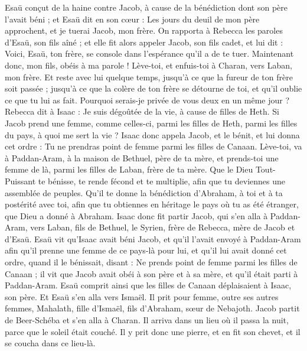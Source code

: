 \begin{multicols}{2}
Esaü conçut de la haine contre Jacob, à cause de la bénédiction dont son père l'avait béni ; et Esaü dit en son cœur : Les jours du deuil de mon père approchent, et je tuerai Jacob, mon frère.
On rapporta à Rebecca les paroles d'Esaü, son fils aîné ; et elle fit alors appeler Jacob, son fils cadet, et lui dit : Voici, Esaü, ton frère, se console dans l'espérance qu'il a de te tuer.
Maintenant donc, mon fils, obéis à ma parole ! Lève-toi, et enfuis-toi à Charan, vers Laban, mon frère.
Et reste avec lui quelque temps, jusqu'à ce que la fureur de ton frère soit passée ;
jusqu’à ce que la colère de ton frère se détourne de toi, et qu'il oublie ce que tu lui as fait. Pourquoi serais-je privée de vous deux en un même jour ?
Rebecca dit à Isaac : Je suis dégoûtée de la vie, à cause de filles de Heth. Si Jacob prend une femme, comme celles-ci, parmi les filles de Heth, parmi les filles du pays, à quoi me sert la vie ?
\VerseOne{}Isaac donc appela Jacob, et le bénit, et lui donna cet ordre : Tu ne prendras point de femme parmi les filles de Canaan.
Lève-toi, va à Paddan-Aram, à la maison de Bethuel, père de ta mère, et prends-toi une femme de là, parmi les filles de Laban, frère de ta mère.
Que le Dieu Tout-Puissant te bénisse, te rende fécond et te multiplie, afin que tu deviennes une assemblée de peuples.
Qu’il te donne la bénédiction d'Abraham, à toi et à ta postérité avec toi, afin que tu obtiennes en héritage le pays où tu as été étranger, que Dieu a donné à Abraham.
Isaac donc fit partir Jacob, qui s'en alla à Paddan-Aram, vers Laban, fils de Bethuel, le Syrien, frère de Rebecca, mère de Jacob et d'Esaü.
Esaü vit qu'Isaac avait béni Jacob, et qu'il l'avait envoyé à Paddan-Aram afin qu'il prenne une femme de ce pays-là pour lui, et qu'il lui avait donné cet ordre, quand il le bénissait, disant : Ne prends point de femme parmi les filles de Canaan ;
il vit que Jacob avait obéi à son père et à sa mère, et qu’il était parti à Paddan-Aram.
Esaü comprit ainsi que les filles de Canaan déplaisaient à Isaac, son père.
Et Esaü s’en alla vers Ismaël. Il prit pour femme, outre ses autres femmes, Mahalath, fille d'Ismaël, fils d'Abraham, sœur de Nebajoth.
Jacob partit de Beer-Schéba et s'en alla à Charan.
Il arriva dans un lieu où il passa la nuit, parce que le soleil était couché. Il y prit donc une pierre, et en fit son chevet, et il se coucha dans ce lieu-là.

\end{multicols}
